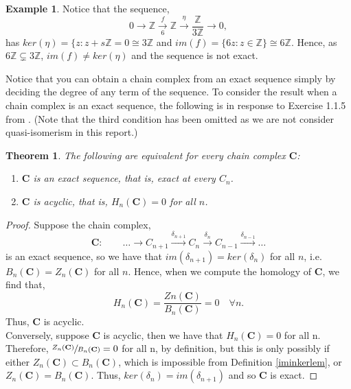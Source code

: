 \documentclass[11.5pt, twoside, a4paper, titlepage]{report}
\providecommand{\bb}[1]{\mathbb{#1}}
\theoremstyle{definition}
\newtheorem{eg}[mydef]{Example}
\theoremstyle{plain}
\newtheorem{thm}[mydef]{Theorem}
\begin{document}
\begin{eg}
Notice that the sequence, 
\begin{equation*}
0\xrightarrow{}\bb{Z}\xrightarrow[6]{f}\bb{Z}\xrightarrow{\eta}\frac{\bb{Z}}{3\bb{Z}}\xrightarrow{} 0,
\end{equation*}
has $ker(\eta)=\{z:z+s\bb{Z}=0\cong 3\bb{Z}$ and $im(f)=\{6z:z\in \bb{Z}\}\cong 6\bb{Z}$. Hence, as $6\bb{Z}\subsetneq 3\bb{Z}$, $im(f)\neq ker(\eta)$ and the sequence is not exact.
\end{eg}

Notice that you can obtain a chain complex from an exact sequence simply by deciding the degree of any term of the sequence. To consider the result when a chain complex is an exact sequence, the following is in response to Exercise 1.1.5 from \cite{Weibel}. (Note that the third condition has been omitted as we are not consider quasi-isomerism in this report.)

\begin{thm}
The following are equivalent for every chain complex $\mathbf{C}$:
\begin{enumerate}
\item $\mathbf{C}$ is an exact sequence, that is, exact at every $C_n$.
\item $\mathbf{C}$ is acyclic, that is, $H_n(\mathbf{C})=0$ for all $n$.
\end{enumerate}
\end{thm}
\begin{proof}
Suppose the chain complex, 
\begin{equation*}
\mathbf{C}:\qquad \dots \xrightarrow{} C_{n+1} \xrightarrow{\delta_{n+1}} C_n \xrightarrow{\delta_n} C_{n-1} \xrightarrow{\delta_{n-1}} \dots
\end{equation*}
is an exact sequence, so we have that $im(\delta_{n+1})=ker(\delta_n)$ for all $n$, i.e. $B_n(\mathbf{C})=Z_n(\mathbf{C})$ for all $n$. Hence, when we compute the homology of $\mathbf{C}$, we find that,
\begin{equation*}
H_n(\mathbf{C})=\frac{Zn(\mathbf{C})}{B_n(\mathbf{C})}=0 \quad \forall n.
\end{equation*}
Thus, $\mathbf{C}$ is acyclic.\\
Conversely, suppose $\mathbf{C}$ is acyclic, then we have that $H_n(\mathbf{C})=0$ for all n. Therefore, $\sfrac{Z_n(\mathbf{C})}{B_n(\mathbf{C})}=0$ for all n, by definition, but this is only possibly if either $Z_n(\mathbf{C})\subset B_n(\mathbf{C})$, which is impossible from Definition \ref{iminkerlem}, or $Z_n(\mathbf{C})=B_n(\mathbf{C})$. Thus, $ker(\delta_n)=im(\delta_{n+1})$ and so $\mathbf{C}$ is exact.
\end{proof}
\end{document}
